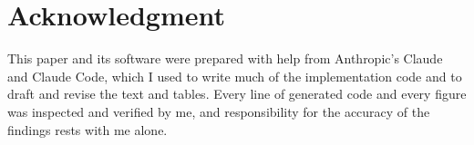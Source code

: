 \section*{Acknowledgment}

This paper and its software were prepared with help from Anthropic's Claude and Claude Code, which I used to write much of the implementation code and to draft and revise the text and tables. Every line of generated code and every figure was inspected and verified by me, and responsibility for the accuracy of the findings rests with me alone.
